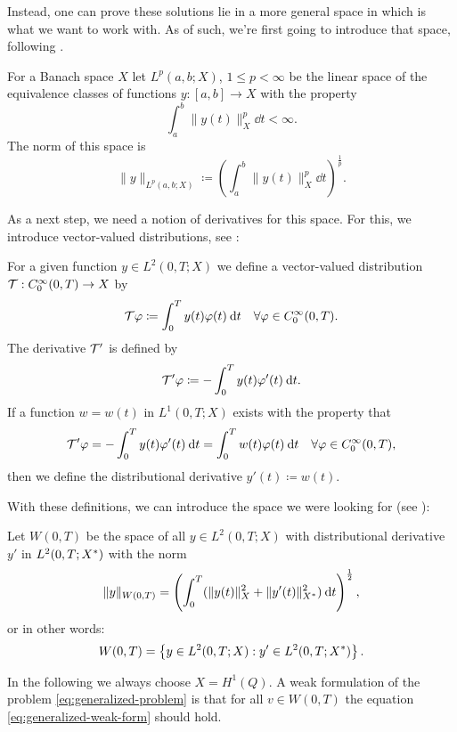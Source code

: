 \documentclass[../thesis.tex]{subfiles}
\begin{document}
Instead, one can prove these solutions lie in a more general space in which is what we want to work with. As of such, we're first going to introduce that space, following \cite[3.4.1 Abstrakte Funktionen, p.\ 113ff.]{Troeltzsch}.
\begin{definition}
For a Banach space $X$ let $L^p(a, b; X)$, $1 \leq p < \infty$ be the linear space of the equivalence classes of functions $y : [a, b] \to X$ with the property
\[
	\int_a^b \| y(t) \|_X^p \dd t < \infty.
\]
The norm of this space is
\[
	\| y \|_{L^p(a, b; X)} \coloneqq \left( \int_a^b \| y(t) \|_X^p \dd t \right)^{\frac{1}{p}}.
\]
\end{definition}
As a next step, we need a notion of derivatives for this space. For this, we introduce vector-valued distributions, see \cite[p.\ 117]{Troeltzsch}:
\begin{definition}
For a given function $y \in L^2(0, T; X)$ we define a vector-valued distribution $\mathcal{T} : C_0^\infty(0, T) \to X$ by
\[
	\mathcal{T} \varphi \coloneqq \int_0^T y(t) \varphi(t) \:\mathrm{d} t \quad \forall \varphi \in C_0^\infty(0, T).
\] 
The derivative $\mathcal{T}'$ is defined by
\[
	\mathcal{T}' \varphi \coloneqq - \int_0^T y(t) \varphi'(t) \:\mathrm{d} t.
\]
If a function $w = w(t)$ in $L^1(0, T; X)$ exists with the property that
\[
	\mathcal{T}' \varphi = - \int_0^T y(t) \varphi'(t) \:\mathrm{d} t = \int_0^T w(t) \varphi(t) \:\mathrm{d} t \quad \forall \varphi \in C_0^\infty(0, T),
\]
then we define the distributional derivative $y'(t) \coloneqq w(t)$.
\end{definition}
With these definitions, we can introduce the space we were looking for (see \cite[p.\ 118]{Troeltzsch}):
\begin{definition}
Let $W(0, T)$ be the space of all $y \in L^2(0, T; X)$ with distributional derivative $y'$ in $L^2(0, T; X^*)$ with the norm
\[
	\| y \|_{W(0, T)} = \left( \int_0^T ( \| y(t) \|_X^2 + \| y'(t) \|_{X^*}^2 ) \:\mathrm{d} t \right)^{\frac{1}{2}},
\]
or in other words:
\[
	W(0, T) = \left\{ y \in L^2(0, T; X) \mathrel{}:\mathrel{} y' \in L^2(0, T; X^*) \right\}.
\]
\end{definition}
In the following we always choose $X = H^1(Q)$. A weak formulation of the problem \cref{eq:generalized-problem} is that for all $v \in W(0, T)$ the equation \cref{eq:generalized-weak-form} should hold.
\end{document}
